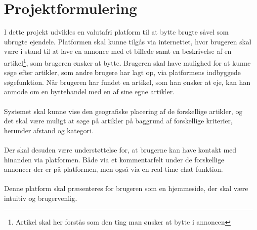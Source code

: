 \chapter{Projektformulering}

I dette projekt udvikles en valutafri platform til at bytte brugte såvel som ubrugte ejendele. Platformen skal kunne tilgås via internettet, hvor brugeren skal være i stand til at lave en annonce med et billede samt en beskrivelse af en artikel\footnote{Artikel skal her forstås som den ting man ønsker at bytte i annoncen}, som brugeren ønsker at bytte. Brugeren skal have mulighed for at kunne søge efter artikler, som andre brugere har lagt op, via platformens indbyggede søgefunktion. Når brugeren har fundet en artikel, som han ønsker at eje, kan han anmode om en byttehandel med en af sine egne artikler. \\ \\ \noindent
Systemet skal kunne vise den geografiske placering af de forskellige artikler, og det skal være muligt at søge på artikler på baggrund af forskellige kriterier, herunder afstand og kategori. \\ \\ \noindent    
Der skal desuden være understøttelse for, at brugerne kan have kontakt med hinanden via platformen. Både via et kommentarfelt under de forskellige annoncer der er på platformen, men også via en real-time chat funktion. \\ \\ \noindent
\noindent Denne platform skal præsenteres for brugeren som en hjemmeside, der skal være intuitiv og brugervenlig. 